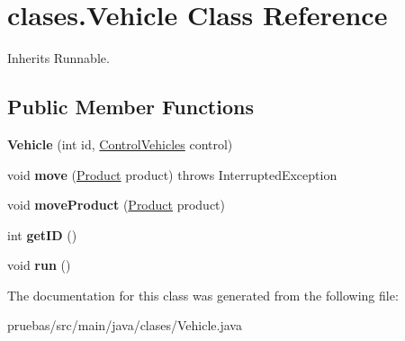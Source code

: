 \hypertarget{classclases_1_1_vehicle}{}\section{clases.\+Vehicle Class Reference}
\label{classclases_1_1_vehicle}


Inherits Runnable.

\subsection*{Public Member Functions}
\begin{DoxyCompactItemize}
\item 
\mbox{\label{classclases_1_1_vehicle_a81df327dc6c0e7e4aec61774ccf8cd53}} 
{\bfseries Vehicle} (int id, \mbox{\hyperlink{classcontrol_1_1_control_vehicles}{Control\+Vehicles}} control)
\item 
\mbox{\label{classclases_1_1_vehicle_aed30e6f35ff4a97ba674a512db100480}} 
void {\bfseries move} (\mbox{\hyperlink{classclases_1_1_product}{Product}} product)  throws Interrupted\+Exception 
\item 
\mbox{\label{classclases_1_1_vehicle_a1f34ee065a6e13bb1b2fbbf76f118b9b}} 
void {\bfseries move\+Product} (\mbox{\hyperlink{classclases_1_1_product}{Product}} product)
\item 
\mbox{\label{classclases_1_1_vehicle_aff601a5fcf414d20838a594e6ed2d576}} 
int {\bfseries get\+ID} ()
\item 
\mbox{\label{classclases_1_1_vehicle_a1b1928593230ee67dd07c6023f615fa1}} 
void {\bfseries run} ()
\end{DoxyCompactItemize}


The documentation for this class was generated from the following file\+:\begin{DoxyCompactItemize}
\item 
pruebas/src/main/java/clases/Vehicle.\+java\end{DoxyCompactItemize}
